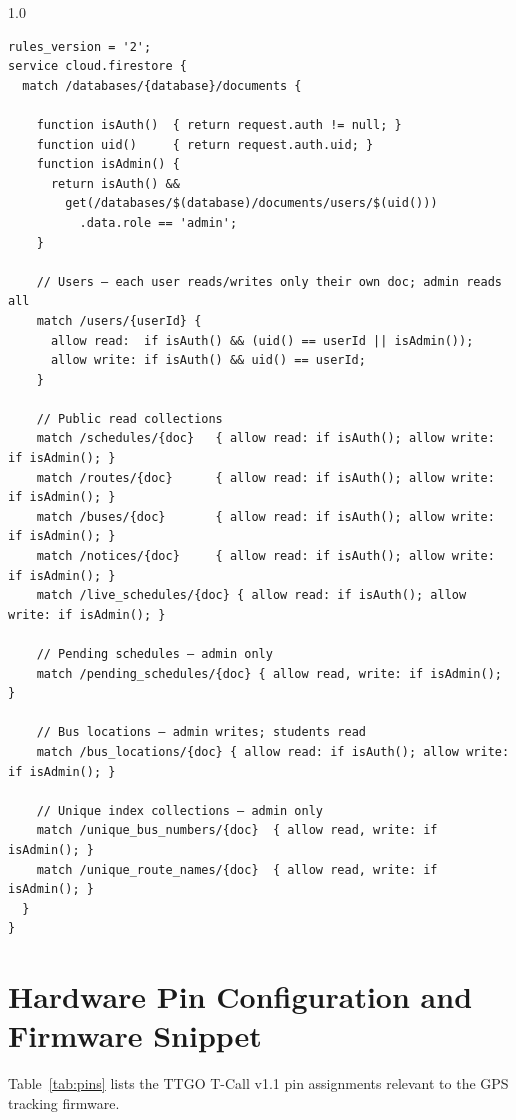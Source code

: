 \documentclass[12pt,a4paper]{report}
\begin{document}
\begin{spacing}{1.0}
\small
\begin{verbatim}
rules_version = '2';
service cloud.firestore {
  match /databases/{database}/documents {

    function isAuth()  { return request.auth != null; }
    function uid()     { return request.auth.uid; }
    function isAdmin() {
      return isAuth() &&
        get(/databases/$(database)/documents/users/$(uid()))
          .data.role == 'admin';
    }

    // Users — each user reads/writes only their own doc; admin reads all
    match /users/{userId} {
      allow read:  if isAuth() && (uid() == userId || isAdmin());
      allow write: if isAuth() && uid() == userId;
    }

    // Public read collections
    match /schedules/{doc}   { allow read: if isAuth(); allow write: if isAdmin(); }
    match /routes/{doc}      { allow read: if isAuth(); allow write: if isAdmin(); }
    match /buses/{doc}       { allow read: if isAuth(); allow write: if isAdmin(); }
    match /notices/{doc}     { allow read: if isAuth(); allow write: if isAdmin(); }
    match /live_schedules/{doc} { allow read: if isAuth(); allow write: if isAdmin(); }

    // Pending schedules — admin only
    match /pending_schedules/{doc} { allow read, write: if isAdmin(); }

    // Bus locations — admin writes; students read
    match /bus_locations/{doc} { allow read: if isAuth(); allow write: if isAdmin(); }

    // Unique index collections — admin only
    match /unique_bus_numbers/{doc}  { allow read, write: if isAdmin(); }
    match /unique_route_names/{doc}  { allow read, write: if isAdmin(); }
  }
}
\end{verbatim}
\end{spacing}

\chapter{Hardware Pin Configuration and Firmware Snippet}

Table~\ref{tab:pins} lists the TTGO T-Call v1.1 pin assignments relevant to the GPS tracking firmware.
\end{document}
